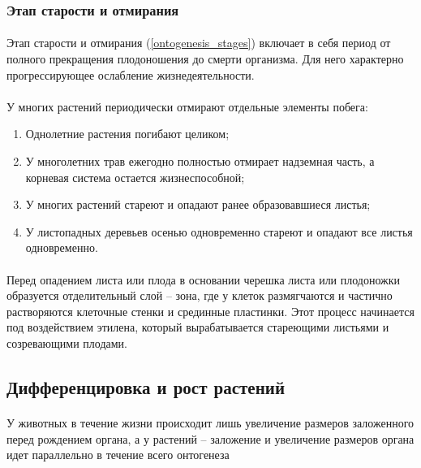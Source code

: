 \subsubsection*{Этап старости и отмирания}

\paragraph*{}Этап старости и отмирания (\ris \ref{ontogenesis_stages}) включает в себя период от полного прекращения плодоношения до смерти организма. Для него характерно прогрессирующее ослабление жизнедеятельности. 

\paragraph*{}У многих растений периодически отмирают отдельные элементы побега:
\begin{enumerate}
	\item Однолетние растения погибают целиком;
	\item У многолетних трав ежегодно полностью отмирает надземная часть, а корневая система остается жизнеспособной;
	\item У многих растений стареют и опадают ранее образовавшиеся листья;
	\item У листопадных деревьев осенью одновременно стареют и опадают все листья одновременно. 
\end{enumerate}

\paragraph*{}Перед опадением листа или плода в основании черешка листа или плодоножки образуется отделительный слой -- зона, где у клеток размягчаются и частично растворяются клеточные стенки и срединные пластинки. Этот процесс начинается под воздействием этилена, который вырабатывается стареющими листьями и созревающими плодами.

\subsection*{Дифференцировка и рост растений}

\paragraph*{}У животных в течение жизни происходит лишь увеличение размеров заложенного перед рождением органа, а у растений -- заложение и увеличение размеров органа идет параллельно в течение всего онтогенеза

